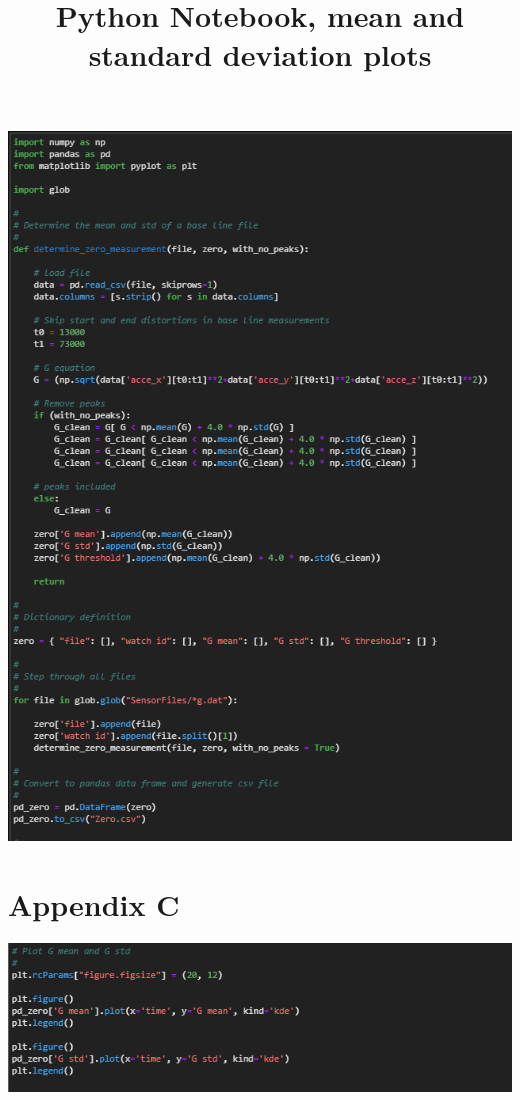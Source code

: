 \documentclass[12pt, a4paper]{article}
\begin{document}
\begin{center}
      \includegraphics[width=.9\textwidth]{Pic 43.png}  
\end{center}

\section{Appendix C}
\title{Python Notebook, mean and standard deviation plots}

\begin{center}
      \includegraphics[width=.9\textwidth]{Pic 45.png}  
\end{center}
\end{document}
